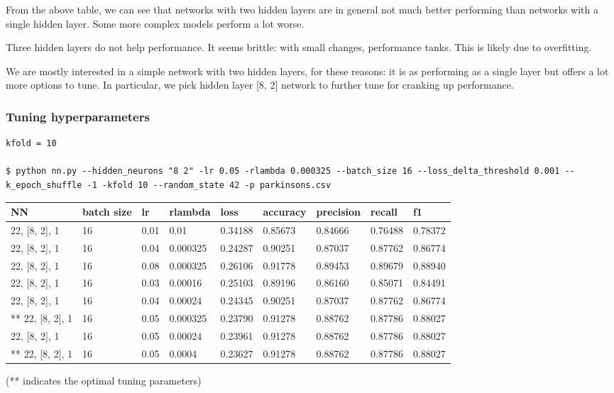 From the above table, we can see that networks with two hidden layers are in general not much better performing than networks with a single hidden layer. Some more complex models perform a lot worse. 

Three hidden layers do not help performance. It seems brittle: with small changes, performance tanks.  This is likely due to overfitting. 

We are mostly interested in a simple network with two hidden layers, for these reasons: it is as performing as a single layer but offers a lot more options to tune. In particular, we pick hidden layer [8, 2] network to further tune for cranking up performance.  

\subsubsection{Tuning hyperparameters}
\begin{verbatim}
kfold = 10

$ python nn.py --hidden_neurons "8 2" -lr 0.05 -rlambda 0.000325 --batch_size 16 --loss_delta_threshold 0.001 --k_epoch_shuffle -1 -kfold 10 --random_state 42 -p parkinsons.csv
\end{verbatim}

\begin{tabular}{|l|l|l|l|l|l|l|l|l|}
\hline
    NN & batch size & lr & rlambda & loss & accuracy & precision & recall & f1 \\ \hline
    22, [8, 2], 1 & 16 & 0.01 & 0.01 & 0.34188 & 0.85673 & 0.84666 & 0.76488 & 0.78372 \\
    22, [8, 2], 1 & 16 & 0.04 & 0.000325 & 0.24287 & 0.90251 & 0.87037 & 0.87762 & 0.86774 \\
    22, [8, 2], 1 & 16 & 0.08 & 0.000325 & 0.26106 & 0.91778 & 0.89453 & 0.89679 & 0.88940 \\
    22, [8, 2], 1 & 16 & 0.03 & 0.00016 & 0.25103 & 0.89196 & 0.86160 & 0.85071 & 0.84491 \\
    22, [8, 2], 1 & 16 & 0.04 & 0.00024 & 0.24345 & 0.90251 & 0.87037 & 0.87762 & 0.86774 \\
    ** 22, [8, 2], 1 & 16 & 0.05 & 0.000325 & 0.23790 & 0.91278 & 0.88762 & 0.87786 & 0.88027 \\
    22, [8, 2], 1 & 16 & 0.05 & 0.00024 & 0.23961 & 0.91278 & 0.88762 & 0.87786 & 0.88027 \\
    ** 22, [8, 2], 1 & 16 & 0.05 & 0.0004 & 0.23627 & 0.91278 & 0.88762 & 0.87786 & 0.88027 \\
\end{tabular}
(** indicates the optimal tuning parameters)



